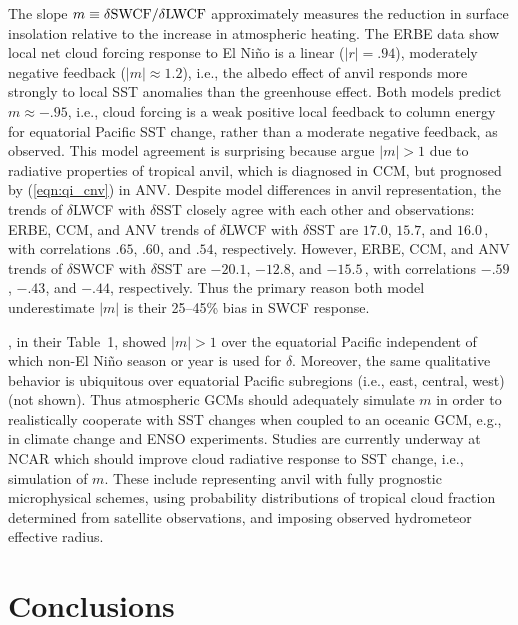 \documentclass[twoside,agupp]{aguplus}
\begin{document}
The slope $m \equiv \delta \mbox{\textrm{SWCF}} / \delta \mbox{\textrm{LWCF}}$ approximately
measures the reduction in surface insolation relative to the increase
in atmospheric heating.
The ERBE data show local net cloud forcing response to El Ni\~no is a
linear ($|r| = .94$), moderately negative feedback ($|m| \approx
1.2$), i.e., the albedo effect of anvil responds more strongly to
local SST anomalies than the greenhouse effect. 
Both models predict $m \approx -.95$, i.e., cloud forcing is a weak
positive local feedback to column energy for equatorial Pacific SST
change, rather than a moderate negative feedback, as observed.
This model agreement is surprising because \cite{RaC91} argue
$|m| > 1$ due to radiative properties of tropical anvil, which is
diagnosed in CCM, but prognosed by (\ref{eqn:qi_cnv}) in ANV.
Despite model differences in anvil representation, the trends of
$\delta$LWCF with $\delta$SST closely agree with each other and
observations: ERBE, CCM, and ANV trends of $\delta$LWCF with
$\delta$SST are $17.0$, $15.7$, and $16.0$\,\wxmSk, with correlations
$.65$, $.60$, and $.54$, respectively.  
However, ERBE, CCM, and ANV trends of $\delta$SWCF with $\delta$SST
are $-20.1$, $-12.8$, and $-15.5$\,\wxmSk, with correlations $-.59$,
$-.43$, and $-.44$, respectively. 
Thus the primary reason both model underestimate $|m|$ is their
25--45\% bias in SWCF response.

\cite{RaC91}, in their Table~1, showed $|m| > 1$ over the equatorial
Pacific independent of which non-El Ni\~no season or year is used for
$\delta$. 
Moreover, the same qualitative behavior is ubiquitous over equatorial
Pacific subregions (i.e., east, central, west) (not shown).
Thus atmospheric GCMs should adequately simulate $m$ in order to
realistically cooperate with SST changes when coupled to an oceanic 
GCM, e.g., in climate change and ENSO experiments.
Studies are currently underway at NCAR which should improve cloud
radiative response to SST change, i.e., simulation of $m$.
These include representing anvil with fully prognostic microphysical
schemes, using probability distributions of tropical cloud fraction
determined from satellite observations, and imposing observed
hydrometeor effective radius. 


\section{Conclusions}\label{sec:anv_cnc}
\end{document}
